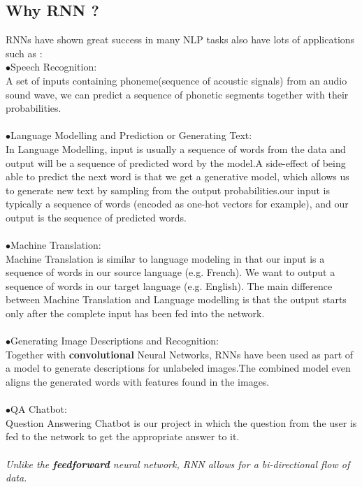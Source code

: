 \subsection{Why RNN ?}
RNNs have shown great success in many NLP tasks also have lots of applications such as :\\
\indent$\bullet$Speech Recognition:\\
A set of inputs containing phoneme(sequence of acoustic signals) from an audio sound wave, we can predict a sequence of phonetic segments together with their probabilities.\\\\
\indent$\bullet$Language Modelling and Prediction or  Generating Text:\\
In Language Modelling, input is usually a sequence of words from the data and output will be a sequence of predicted word by the model.A side-effect of being able to predict the next word is that we get a generative model, which allows us to generate new text by sampling from the output probabilities.our input is typically a sequence of words (encoded as one-hot vectors for example), and our output is the sequence of predicted words.\\\\
\indent$\bullet$Machine Translation:\\
Machine Translation is similar to language modeling in that our input is a sequence of words in our source language (e.g. French). We want to output a sequence of words in our target language (e.g. English).
The main difference between Machine Translation and Language modelling is that the output starts only after the complete input has been fed into the network.\\\\
\indent$\bullet$Generating Image Descriptions and Recognition:\\
Together with \textbf{convolutional} Neural Networks, RNNs have been used as part of a model to generate descriptions for unlabeled images.The combined model even aligns the generated words with features found in the images.\\\\
\indent$\bullet$QA Chatbot:\\
Question Answering Chatbot is our project in which  the question from the user is fed to the network to get the appropriate answer to it. \\\\
\textit{Unlike the \textbf{feedforward} neural network, RNN allows for a bi-directional flow of data.}\\\\
